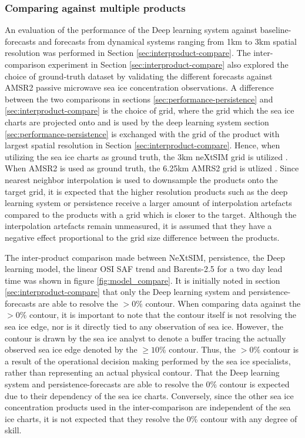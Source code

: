 \documentclass[../main/thesis]{subfiles}
\begin{document}
\subsubsection{Comparing against multiple products}
An evaluation of the performance of the Deep learning system against baseline-forecasts and forecasts from dynamical systems ranging from 1km to 3km spatial resolution was performed in Section \ref{sec:interproduct-compare}. The inter-comparison experiment in Section \ref{sec:interproduct-compare} also explored the choice of ground-truth dataset by validating the different forecasts against AMSR2 passive microwave sea ice concentration observations. A difference between the two comparisons in sections \ref{sec:performance-persistence} and \ref{sec:interproduct-compare} is the choice of grid, where the grid which the sea ice charts are projected onto and is used by the deep learning system section \ref{sec:performance-persistence} is exchanged with the grid of the product with largest spatial resolution in Section \ref{sec:interproduct-compare}. Hence, when utilizing the sea ice charts as ground truth, the 3km neXtSIM grid is utilized \citep{Williams2021}. When AMSR2 is used as ground truth, the 6.25km AMRS2 grid is utlized \citep{Spreen2008}. Since nearest neighbor interpolation is used to downsample the products onto the target grid, it is expected that the higher resolution products such as the deep learning system or persistence receive a larger amount of interpolation artefacts compared to the products with a grid which is closer to the target. Although the interpolation artefacts remain unmeasured, it is assumed that they have a negative effect proportional to the grid size difference between the products.

The inter-product comparison made between NeXtSIM, persistence, the Deep learning model, the linear OSI SAF trend and Barents-2.5 for a two day lead time was shown in figure \ref{fig:model_compare}. It is initially noted in section \ref{sec:interproduct-compare} that only the Deep learning system and persistence-forecasts are able to resolve the $>0\%$ contour. When comparing data against the $> 0\%$ contour, it is important to note that the contour itself is not resolving the sea ice edge, nor is it directly tied to any observation of sea ice. However, the contour is drawn by the sea ice analyst to denote a buffer tracing the actually observed sea ice edge denoted by the $\geq 10\%$ contour. Thus, the $> 0\%$ contour is a result of the operational decision making performed by the sea ice specialists, rather than representing an actual physical contour. That the Deep learning system and persistence-forecasts are able to resolve the 0\% contour  is expected due to their dependency of the sea ice charts. Conversely, since the other sea ice concentration products used in the inter-comparison are independent of the sea ice charts, it is not expected that they resolve the 0\% contour with any degree of skill.
\end{document}
